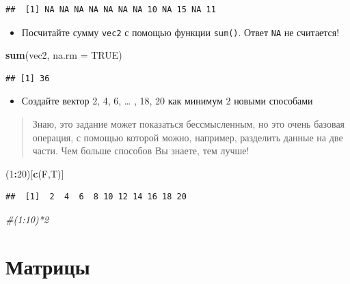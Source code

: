\documentclass[]{book}
\newenvironment{Shaded}{\begin{snugshade}}{\end{snugshade}}
\newcommand{\KeywordTok}[1]{\textcolor[rgb]{0.13,0.29,0.53}{\textbf{#1}}}
\newcommand{\DataTypeTok}[1]{\textcolor[rgb]{0.13,0.29,0.53}{#1}}
\newcommand{\DecValTok}[1]{\textcolor[rgb]{0.00,0.00,0.81}{#1}}
\newcommand{\CommentTok}[1]{\textcolor[rgb]{0.56,0.35,0.01}{\textit{#1}}}
\newcommand{\OtherTok}[1]{\textcolor[rgb]{0.56,0.35,0.01}{#1}}
\newcommand{\OperatorTok}[1]{\textcolor[rgb]{0.81,0.36,0.00}{\textbf{#1}}}
\newcommand{\NormalTok}[1]{#1}
\providecommand{\tightlist}{%
  \setlength{\itemsep}{0pt}\setlength{\parskip}{0pt}}
\begin{document}
\begin{verbatim}
##  [1] NA NA NA NA NA NA NA 10 NA 15 NA 11
\end{verbatim}

\begin{itemize}
\tightlist
\item
  Посчитайте сумму \texttt{vec2} с помощью функции \texttt{sum()}. Ответ
  \texttt{NA} не считается!
\end{itemize}

\begin{Shaded}
\begin{Highlighting}[]
\KeywordTok{sum}\NormalTok{(vec2, }\DataTypeTok{na.rm =} \OtherTok{TRUE}\NormalTok{)}
\end{Highlighting}
\end{Shaded}

\begin{verbatim}
## [1] 36
\end{verbatim}

\begin{itemize}
\tightlist
\item
  Создайте вектор 2, 4, 6, \ldots{} , 18, 20 как минимум 2 новыми
  способами
\end{itemize}

\begin{quote}
Знаю, это задание может показаться бессмысленным, но это очень базовая
операция, с помощью которой можно, например, разделить данные на две
части. Чем больше способов Вы знаете, тем лучше!
\end{quote}

\begin{Shaded}
\begin{Highlighting}[]
\NormalTok{(}\DecValTok{1}\OperatorTok{:}\DecValTok{20}\NormalTok{)[}\KeywordTok{c}\NormalTok{(F,T)]}
\end{Highlighting}
\end{Shaded}

\begin{verbatim}
##  [1]  2  4  6  8 10 12 14 16 18 20
\end{verbatim}

\begin{Shaded}
\begin{Highlighting}[]
\CommentTok{#(1:10)*2}
\end{Highlighting}
\end{Shaded}

\section{Матрицы}\label{solvt}
\end{document}

